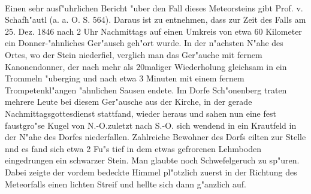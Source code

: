 \documentclass[a4paper, 11pt, oneside]{article}
\begin{document}
\paragraph{}
Einen sehr ausf"uhrlichen Bericht "uber den Fall dieses Meteorsteins gibt Prof. v. Schafh"autl (a. a. O. S. 564). Daraus ist zu entnehmen, dass zur Zeit des Falls am 25. Dez. 1846 nach 2 Uhr Nachmittags auf einen Umkreis von etwa 60 Kilometer ein Donner-"ahnliches Ger"ausch geh"ort wurde. In der n"achsten N"ahe des Ortes, wo der Stein niederfiel, verglich man das Ger"auche mit fernem Kanonendonner, der nach mehr als 20maliger Wiederholung gleichsam in ein Trommeln "uberging und nach etwa 3 Minuten mit einem fernem Trompetenkl"angen "ahnlichen Sausen endete. Im Dorfe Sch"onenberg traten mehrere Leute bei diesem Ger"ausche aus der Kirche, in der gerade Nachmittagsgottesdienst stattfand, wieder heraus und sahen nun eine fest faustgro"se Kugel von N.-O.zuletzt nach S.-O. sich wendend in ein Krautfeld in der N"ahe des Dorfes niederfallen. Zahlreiche Bewohner des Dorfs eilten zur Stelle nnd es fand sich etwa 2 Fu"s tief in dem etwas gefrorenen Lehmboden eingedrungen ein schwarzer Stein. Man glaubte noch Schwefelgeruch zu sp"uren. Dabei zeigte der vordem bedeckte Himmel pl"otzlich zuerst in der Richtung des Meteorfalls einen lichten Streif und hellte sich dann g"anzlich auf.
\end{document}
